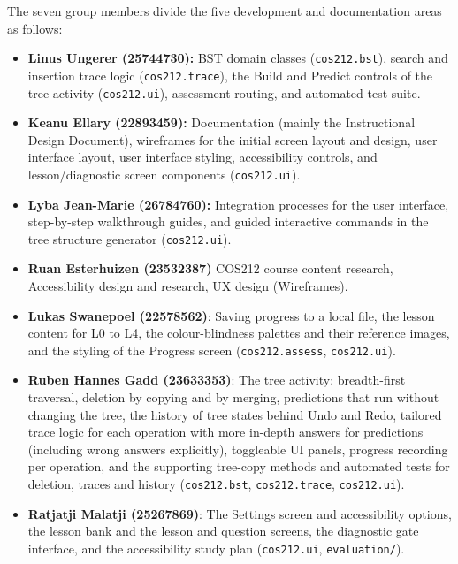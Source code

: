 The seven group members divide the five development and documentation areas as follows:
\begin{itemize}
    \item \textbf{Linus Ungerer (25744730):} BST domain classes (\texttt{cos212.bst}), search and insertion trace logic (\texttt{cos212.trace}), the Build and Predict controls of the tree activity (\texttt{cos212.ui}), assessment routing, and automated test suite.
    \item \textbf{Keanu Ellary (22893459):} Documentation (mainly the Instructional Design Document), wireframes for the initial screen layout and design, user interface layout, user interface styling, accessibility controls, and lesson/diagnostic screen components (\texttt{cos212.ui}).
    \item \textbf{Lyba Jean-Marie (26784760):} Integration processes for the user interface, step-by-step walkthrough guides, and guided interactive commands in the tree structure generator (\texttt{cos212.ui}).
    \item \textbf{Ruan Esterhuizen (23532387)} COS212 course content research, Accessibility design and research, UX design (Wireframes). 
    \item \textbf{Lukas Swanepoel (22578562)}: Saving progress to a local file, the lesson content for L0 to L4, the colour-blindness palettes and their reference images, and the styling of the Progress screen (\texttt{cos212.assess}, \texttt{cos212.ui}).
    \item \textbf{Ruben Hannes Gadd (23633353)}: The tree activity: breadth-first traversal, deletion by copying and by merging, predictions that run without changing the tree, the history of tree states behind Undo and Redo, tailored trace logic for each operation with more in-depth answers for predictions (including wrong answers explicitly), toggleable UI panels, progress recording per operation, and the supporting tree-copy methods and automated tests for deletion, traces and history (\texttt{cos212.bst}, \texttt{cos212.trace}, \texttt{cos212.ui}).
    \item \textbf{Ratjatji Malatji (25267869)}: The Settings screen and accessibility options, the lesson bank and the lesson and question screens, the diagnostic gate interface, and the accessibility study plan (\texttt{cos212.ui}, \texttt{evaluation/}).
\end{itemize}

